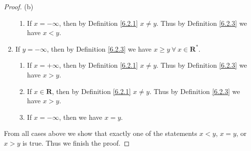 \begin{proof}{(b)}
\begin{enumerate}[label=(\Roman*)]
\begin{enumerate}[label=(\roman*)]
                  \item If \(x = -\infty\), then by Definition \ref{6.2.1} \(x \neq y\).
                        Thus by Definition \ref{6.2.3} we have \(x < y\).
              \end{enumerate}
        \item If \(y = -\infty\), then by Definition \ref{6.2.3} we have \(x \geq y \ \forall\ x \in \mathbf{R}^*\).
              \begin{enumerate}[label=(\roman*)]
                  \item If \(x = +\infty\), then by Definition \ref{6.2.1} \(x \neq y\).
                        Thus by Definition \ref{6.2.3} we have \(x > y\).
                  \item If \(x \in \mathbf{R}\), then by Definition \ref{6.2.1} \(x \neq y\).
                        Thus by Definition \ref{6.2.3} we have \(x > y\).
                  \item If \(x = -\infty\), then we have \(x = y\).
              \end{enumerate}
    \end{enumerate}
    From all cases above we show that exactly one of the statements \(x < y\), \(x = y\), or \(x > y\) is true.
    Thus we finish the proof.
\end{proof}

